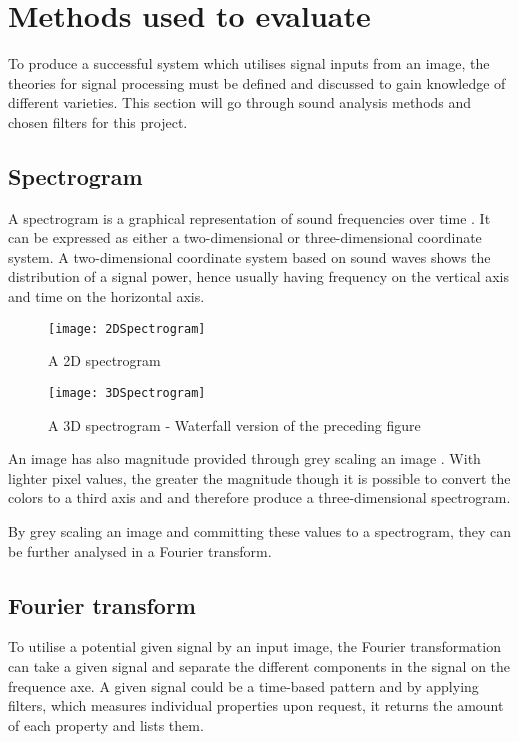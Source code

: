 \section{Methods used to evaluate}\label{sec:methodsusedtoevaluate}

To produce a successful system which utilises signal inputs from an image, the theories for signal processing must be defined and discussed to gain knowledge of different varieties. This section will go through sound analysis methods and chosen filters for this project. 

\subsection{Spectrogram}\label{sub:spectrogram}

A spectrogram is a graphical representation of sound frequencies over time \cite{Izotope2014}. It can be expressed as either a two-dimensional or three-dimensional coordinate system. A two-dimensional coordinate system based on sound waves shows the distribution of a signal power, hence usually having frequency on the vertical axis and time on the horizontal axis.

\begin{figure}[!h]
\centering
\texttt{[image: 2DSpectrogram]}
\caption{\label{fig:2DSpectrogram} A 2D spectrogram \cite{steilglitz1997digital}}
\end{figure}

\begin{figure}[!h]
\centering
\texttt{[image: 3DSpectrogram]}
\caption{\label{fig:3DSpectrogram} A 3D spectrogram - Waterfall version of the preceding figure \cite{steilglitz1997digital}}
\end{figure}

An image has also magnitude provided through grey scaling an image \cite{Izotope2014}. With lighter pixel values, the greater the magnitude though it is possible to convert the colors to a third axis and and therefore produce a three-dimensional spectrogram.

By grey scaling an image and committing these values to a spectrogram, they can be further analysed in a Fourier transform.  

\subsection{Fourier transform}\label{sub:fourier}

To utilise a potential given signal by an input image, the Fourier transformation can take a given signal and separate the different components in the signal on the frequence axe. A given signal could be a time-based pattern and by applying filters, which measures individual properties upon request, it returns the amount of each property and lists them. 


